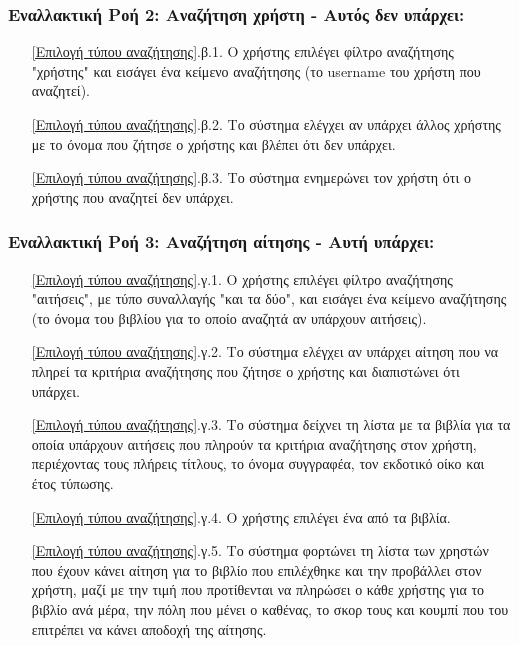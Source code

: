 \documentclass[12pt,a4paper]{article}
\begin{document}
\subsubsection*{Εναλλακτική Ροή 2: Αναζήτηση χρήστη - Αυτός δεν υπάρχει:}
\begin{enumerate}
    \item[\ref{Επιλογή τύπου αναζήτησης}.β.1.] Ο χρήστης επιλέγει φίλτρο αναζήτησης "χρήστης" και εισάγει ένα κείμενο αναζήτησης (το username του χρήστη που αναζητεί).
    \item[\ref{Επιλογή τύπου αναζήτησης}.β.2.] Το σύστημα ελέγχει αν υπάρχει άλλος χρήστης με το όνομα που ζήτησε ο χρήστης και βλέπει ότι δεν υπάρχει.
    \item[\ref{Επιλογή τύπου αναζήτησης}.β.3.] Το σύστημα ενημερώνει τον χρήστη ότι ο χρήστης που αναζητεί δεν υπάρχει.
\end{enumerate}

\subsubsection*{Εναλλακτική Ροή 3: Αναζήτηση αίτησης - Αυτή υπάρχει:}
\begin{enumerate}
    \item[\ref{Επιλογή τύπου αναζήτησης}.γ.1.] Ο χρήστης επιλέγει φίλτρο αναζήτησης "αιτήσεις", με τύπο συναλλαγής "και τα δύο", και εισάγει ένα κείμενο αναζήτησης (το όνομα του βιβλίου για το οποίο αναζητά αν υπάρχουν αιτήσεις).
    \item[\ref{Επιλογή τύπου αναζήτησης}.γ.2.] Το σύστημα ελέγχει αν υπάρχει αίτηση που να πληρεί τα κριτήρια αναζήτησης που ζήτησε ο χρήστης και διαπιστώνει ότι υπάρχει.
    \item[\ref{Επιλογή τύπου αναζήτησης}.γ.3.] Το σύστημα δείχνει τη λίστα με τα βιβλία για τα οποία υπάρχουν αιτήσεις που πληρούν τα κριτήρια αναζήτησης στον χρήστη, περιέχοντας τους πλήρεις τίτλους, το όνομα συγγραφέα, τον εκδοτικό οίκο και έτος τύπωσης.
    \item[\ref{Επιλογή τύπου αναζήτησης}.γ.4.] Ο χρήστης επιλέγει ένα από τα βιβλία.
    \item[\ref{Επιλογή τύπου αναζήτησης}.γ.5.] Το σύστημα φορτώνει τη λίστα των χρηστών που έχουν κάνει αίτηση για το βιβλίο που επιλέχθηκε και την προβάλλει στον χρήστη, μαζί με την τιμή που προτίθενται να πληρώσει ο κάθε χρήστης για το βιβλίο ανά μέρα, την πόλη που μένει ο καθένας, το σκορ τους και κουμπί που του επιτρέπει να κάνει αποδοχή της αίτησης.
\end{enumerate}
\end{document}
